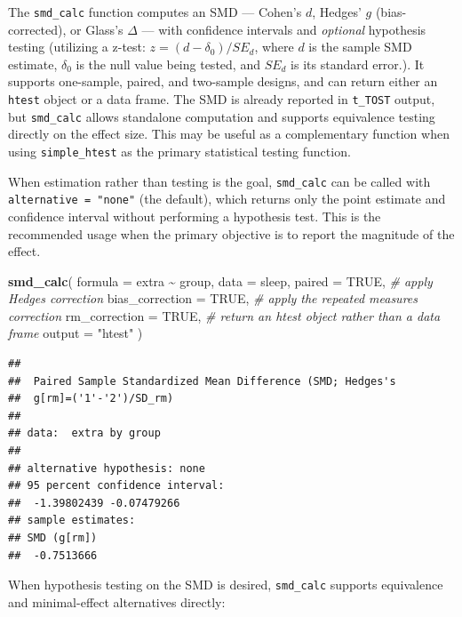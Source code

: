 \documentclass[]{interact}
\theoremstyle{plain}%
\theoremstyle{definition}
\theoremstyle{remark}
\newenvironment{Shaded}{\begin{snugshade}}{\end{snugshade}}
\newcommand{\AttributeTok}[1]{\textcolor[rgb]{0.13,0.29,0.53}{#1}}
\newcommand{\CommentTok}[1]{\textcolor[rgb]{0.56,0.35,0.01}{\textit{#1}}}
\newcommand{\ConstantTok}[1]{\textcolor[rgb]{0.56,0.35,0.01}{#1}}
\newcommand{\FunctionTok}[1]{\textcolor[rgb]{0.13,0.29,0.53}{\textbf{#1}}}
\newcommand{\NormalTok}[1]{#1}
\newcommand{\SpecialCharTok}[1]{\textcolor[rgb]{0.81,0.36,0.00}{\textbf{#1}}}
\newcommand{\StringTok}[1]{\textcolor[rgb]{0.31,0.60,0.02}{#1}}
\begin{document}
The \texttt{smd\_calc} function computes an SMD --- Cohen's \(d\),
Hedges' \(g\) (bias-corrected), or Glass's \(\Delta\) --- with
confidence intervals and \emph{optional} hypothesis testing (utilizing a
z-test: \(z = (d - \delta_0)/SE_d\), where \(d\) is the sample SMD
estimate, \(\delta_0\) is the null value being tested, and \(SE_d\) is
its standard error.). It supports one-sample, paired, and two-sample
designs, and can return either an \texttt{htest} object or a data frame.
The SMD is already reported in \texttt{t\_TOST} output, but
\texttt{smd\_calc} allows standalone computation and supports
equivalence testing directly on the effect size. This may be useful as a
complementary function when using \texttt{simple\_htest} as the primary
statistical testing function.

When estimation rather than testing is the goal, \texttt{smd\_calc} can
be called with \texttt{alternative\ =\ "none"} (the default), which
returns only the point estimate and confidence interval without
performing a hypothesis test. This is the recommended usage when the
primary objective is to report the magnitude of the effect.

\begin{Shaded}
\begin{Highlighting}[]
\FunctionTok{smd\_calc}\NormalTok{(}
  \AttributeTok{formula =}\NormalTok{ extra }\SpecialCharTok{\textasciitilde{}}\NormalTok{ group,}
  \AttributeTok{data =}\NormalTok{ sleep,}
  \AttributeTok{paired =} \ConstantTok{TRUE}\NormalTok{,}
  \CommentTok{\# apply Hedges\textquotesingle{} correction}
  \AttributeTok{bias\_correction =} \ConstantTok{TRUE}\NormalTok{,}
  \CommentTok{\# apply the repeated measures correction}
  \AttributeTok{rm\_correction =} \ConstantTok{TRUE}\NormalTok{,}
  \CommentTok{\# return an htest object rather than a data frame}
  \AttributeTok{output =} \StringTok{"htest"}
\NormalTok{)}
\end{Highlighting}
\end{Shaded}

\begin{verbatim}
## 
##  Paired Sample Standardized Mean Difference (SMD; Hedges's
##  g[rm]=('1'-'2')/SD_rm)
## 
## data:  extra by group
## 
## alternative hypothesis: none
## 95 percent confidence interval:
##  -1.39802439 -0.07479266
## sample estimates:
## SMD (g[rm]) 
##  -0.7513666
\end{verbatim}

When hypothesis testing on the SMD is desired, \texttt{smd\_calc}
supports equivalence and minimal-effect alternatives directly:
\end{document}
